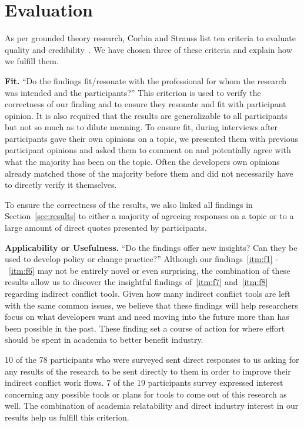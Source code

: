 \documentclass[conference]{IEEEtran}
\begin{document}
\section{Evaluation}
\label{sec:eval}

As per grounded theory research, Corbin and Strauss list ten criteria to evaluate quality and credibility~\cite{Corbin:1998:SP}.
We have chosen three of these criteria and explain how we fulfill them.

{\bfseries Fit.} ``Do the findings fit/resonate with the professional for whom the research was intended and the participants?'' This
criterion is used to verify the correctness of our finding and to ensure they resonate and fit with participant opinion. It is also
required that the results are generalizable to all participants but not so much as to dilute meaning. To ensure fit, during interviews
after participants gave their own opinions on a topic, we presented them with previous participant opinions and asked them to comment
on and potentially agree with what the majority has been on the topic. Often the developers own opinions already matched those of
the majority before them and did not necessarily have to directly verify it themselves.

To ensure the correctness of the results, we also linked all findings in Section~\ref{sec:results} to either a majority of agreeing
responses on a topic or to a large amount of direct quotes presented by participants.

{\bfseries Applicability or Usefulness.} ``Do the findings offer new insights? Can they be used to develop policy or change practice?''
Although our findings~\ref{itm:f1} -~\ref{itm:f6} may not be entirely novel or even surprising, the combination of these results allow us to discover the
insightful findings of~\ref{itm:f7} and~\ref{itm:f8} regarding indirect conflict tools. Given how many indirect conflict tools are left with the same common
issues, we believe that these findings will help researchers focus on what developers want and need moving into the future more than has
been possible in the past. These finding set a course of action for where effort should be spent in academia to better benefit industry.

10 of the 78 participants who were surveyed sent direct responses to us asking for any results of the research to be sent directly to
them in order to improve their indirect conflict work flows. 7 of the 19 participants survey expressed interest concerning any possible
tools or plans for tools to come out of this research as well. The combination of academia relatability and direct industry interest 
in our results help us fulfill this criterion.
\end{document}
